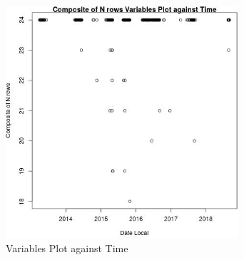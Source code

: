 \begin{figure} 
\centering  
\includegraphics[width=0.77\textwidth]{Code_Outputs/Report_PM25_Step4_part_e_de_duplicated_aves_ML_input_Composite_of_N_rowsvDate_Local.jpg} 
\caption{\label{fig:Report_PM25_Step4_part_e_de_duplicated_aves_ML_inputComposite_of_N_rowsvDate_Local}Variables Plot against Time} 
\end{figure} 
 
